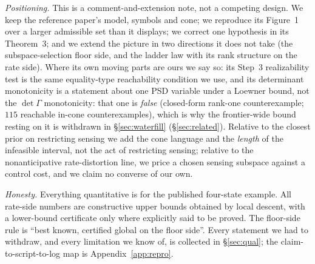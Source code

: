 \emph{Positioning.} This is a comment-and-extension note, not a competing design.
We keep the reference paper's model, symbols and cone; we reproduce its
Figure~1 over a larger admissible set than it displays; we correct one hypothesis
in its Theorem~3; and we extend the picture in two directions it does not take
(the subspace-selection floor side, and the ladder law with its rank structure on
the rate side). Where its own moving parts are ours we say so: its Step~3
realizability test is the same equality-type reachability condition we use, and
its determinant monotonicity is a statement about one PSD variable under a Loewner
bound, not the $\det\Gamma$ monotonicity: that one is \emph{false} (closed-form
rank-one counterexample; $115$ reachable in-cone counterexamples), which is why
the frontier-wide bound resting on it is withdrawn in \S\ref{sec:waterfill}
(\S\ref{sec:related}). Relative to the closest prior on restricting sensing
\cite{cuvelier2021side} we add the cone language and the \emph{length} of the
infeasible interval, not the act of restricting sensing; relative to the
nonanticipative rate-distortion line, we price a chosen sensing subspace against a
control cost, and we claim no converse of our own.

\emph{Honesty.} Everything quantitative is for the published four-state example.
All rate-side numbers are constructive upper bounds obtained by local descent,
with a lower-bound certificate only where explicitly said to be proved. The
floor-side rule is ``best known, certified global on the floor side''. Every
statement we had to withdraw, and every limitation we know of, is collected in
\S\ref{sec:qual}; the claim-to-script-to-log map is Appendix~\ref{app:repro}.
